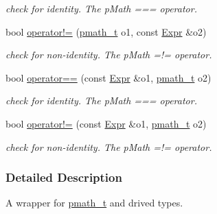 \begin{CompactItemize}
\begin{CompactList}\small\item\em check for identity. The pMath === operator. \item\end{CompactList}\item 
\hypertarget{classpmath_1_1_expr_5fa33e215bf480edf753c398e811e8b2}{
bool \hyperlink{classpmath_1_1_expr_5fa33e215bf480edf753c398e811e8b2}{operator!=} (\hyperlink{classpmath__t}{pmath\_\-t} o1, const \hyperlink{classpmath_1_1_expr}{Expr} \&o2)}
\label{classpmath_1_1_expr_5fa33e215bf480edf753c398e811e8b2}

\begin{CompactList}\small\item\em check for non-identity. The pMath =!= operator. \item\end{CompactList}\item 
\hypertarget{classpmath_1_1_expr_f5aff278fa31906005ddcc185f7573b1}{
bool \hyperlink{classpmath_1_1_expr_f5aff278fa31906005ddcc185f7573b1}{operator==} (const \hyperlink{classpmath_1_1_expr}{Expr} \&o1, \hyperlink{classpmath__t}{pmath\_\-t} o2)}
\label{classpmath_1_1_expr_f5aff278fa31906005ddcc185f7573b1}

\begin{CompactList}\small\item\em check for identity. The pMath === operator. \item\end{CompactList}\item 
\hypertarget{classpmath_1_1_expr_ce3b12796a848ecc42dfb79700c4e24a}{
bool \hyperlink{classpmath_1_1_expr_ce3b12796a848ecc42dfb79700c4e24a}{operator!=} (const \hyperlink{classpmath_1_1_expr}{Expr} \&o1, \hyperlink{classpmath__t}{pmath\_\-t} o2)}
\label{classpmath_1_1_expr_ce3b12796a848ecc42dfb79700c4e24a}

\begin{CompactList}\small\item\em check for non-identity. The pMath =!= operator. \item\end{CompactList}\end{CompactItemize}


\subsubsection{Detailed Description}
A wrapper for \hyperlink{classpmath__t}{pmath\_\-t} and drived types.

